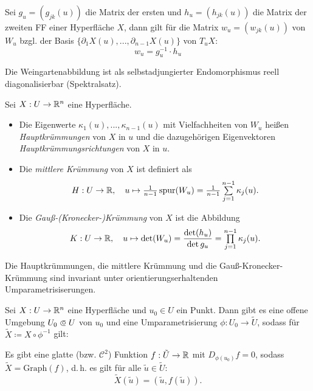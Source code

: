 \documentclass{cheat-sheet}
\newcommand{\Graph}{\mathrm{Graph}}
\begin{document}
\begin{satz}
  Sei $g_u = (g_{jk}(u))$ die Matrix der ersten und $h_u = (h_{jk}(u))$ die Matrix der zweiten FF einer Hyperfläche $X$, dann gilt für die Matrix $w_u = (w_{jk}(u))$ von $W_u$ bzgl. der Basis $\{ \partial_1 X(u), ..., \partial_{n-1} X(u) \}$ von $T_u X$:
  \[ w_u = g_u^{-1} \cdot h_u \]
\end{satz}

\begin{bem}
  Die Weingartenabbildung ist als selbstadjungierter Endomorphismus reell diagonalisierbar (Spektralsatz).
\end{bem}

\begin{defn}
  Sei $X : U \to \mathbb{R}^n$ eine Hyperfläche.
  \begin{itemize}
    \item Die Eigenwerte $\kappa_1(u), ..., \kappa_{n-1}(u)$ mit Vielfachheiten von $W_u$ heißen \emph{Hauptkrümmungen} von $X$ in $u$ und die dazugehörigen Eigenvektoren \emph{Hauptkrümmungsrichtungen} von $X$ in $u$.
    \item Die \emph{mittlere Krümmung} von $X$ ist definiert als
    \[ H : U \to \R, \quad u \mapsto \tfrac{1}{n-1} \, \spur(W_u) = \tfrac{1}{n-1} \sum_{j=1}^{n-1} \kappa_j(u). \]
    \item Die \emph{Gauß-(Kronecker-)Krümmung} von $X$ ist die Abbildung
    \[ K : U \to \R, \quad u \mapsto \det(W_u) = \frac{\det(h_u)}{\det{g_u}} = \prod_{j=1}^{n-1} \kappa_j(u). \]
  \end{itemize}
\end{defn}

\begin{satz}
  Die Hauptkrümmungen, die mittlere Krümmung und die Gauß-Kronecker-Krümmung sind invariant unter orientierungserhaltenden Umparametrisiserungen.
\end{satz}


\begin{satz}
  Sei $X : U \to \mathbb{R}^n$ eine Hyperfläche und $u_0 \in U$ ein Punkt. Dann gibt es eine offene Umgebung $U_0 \opn U$ von $u_0$ und eine Umparametrisierung $\phi : U_0 \to \tilde{U}$, sodass für $\tilde{X} \coloneqq X \circ \phi^{-1}$ gilt:

  Es gibt eine glatte (bzw. $\mathcal{C}^2$) Funktion $f : \tilde{U} \to \mathbb{R}$ mit $D_{\phi(u_0)} f = 0$, sodass $\tilde{X} = \Graph(f)$, d.\,h. es gilt für alle $\tilde{u} \in \tilde{U}$:
  \[ \tilde{X}(\tilde{u}) = (\tilde{u}, f(\tilde{u})). \]
\end{satz}
\end{document}
